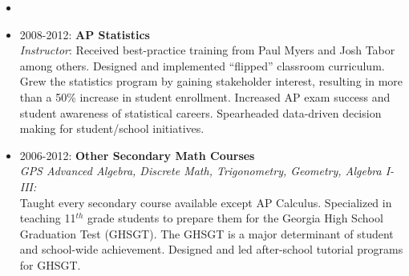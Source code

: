 \documentclass[paper=a4,fontsize=11pt]{scrartcl} %
\newcommand{\CourseEntry}[3]{
		\noindent \item{#1: \textbf{#2} \\ #3}}
\begin{document}
\begin{itemize}
\item[]
\vspace{-24pt}

\CourseEntry{2008-2012}{AP Statistics}{\textit{Instructor}: Received best-practice training from Paul Myers and Josh Tabor among others. Designed and implemented ``flipped'' classroom curriculum. Grew the statistics program by gaining stakeholder interest, resulting in more than a 50\% increase in student enrollment. Increased AP exam success and student awareness of statistical careers. Spearheaded data-driven decision making for student/school initiatives.}
\CourseEntry{2006-2012}{Other Secondary Math Courses}{\textit{GPS Advanced Algebra, Discrete Math, Trigonometry, Geometry, Algebra I-III:} \\Taught every secondary course available except AP Calculus. Specialized in teaching 11$^{th}$ grade students to prepare them for the Georgia High School Graduation Test (GHSGT). The GHSGT is a major determinant of student and school-wide achievement. Designed and led after-school tutorial programs for GHSGT.}

\end{itemize}
\end{document}
